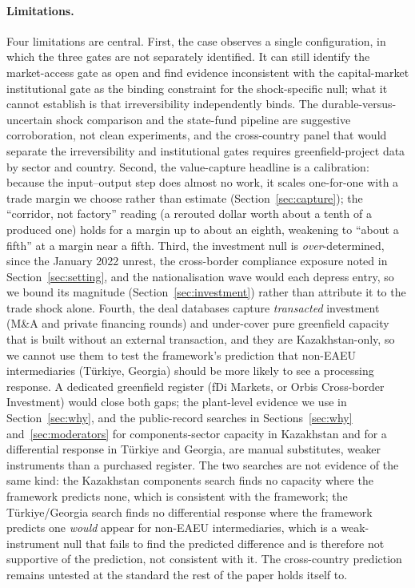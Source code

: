 \documentclass[12pt]{article}
\begin{document}
\paragraph{Limitations.} Four limitations are central. First, the case observes a single
configuration, in which the three gates are not separately identified. It can still identify
the market-access gate as open and find evidence inconsistent with the capital-market
institutional gate as the
binding constraint for the shock-specific null; what it cannot establish is that
irreversibility independently binds. The durable-versus-uncertain shock comparison and the
state-fund pipeline are suggestive corroboration, not clean experiments, and the cross-country
panel that would separate the irreversibility and institutional gates requires
greenfield-project data by sector and country. Second, the value-capture headline is a
calibration: because the input--output step does almost no work, it scales one-for-one with a
trade margin we choose rather than estimate (Section~\ref{sec:capture}); the
``corridor, not factory'' reading (a rerouted dollar worth about a tenth of a produced one)
holds for a margin up to about an eighth, weakening to ``about a fifth'' at a margin near a
fifth. Third, the investment null is
\emph{over}-determined, since the January 2022 unrest, the cross-border compliance exposure
noted in Section~\ref{sec:setting}, and the nationalisation wave would each depress entry, so
we bound its magnitude (Section~\ref{sec:investment}) rather than attribute it to the trade
shock alone. Fourth, the deal databases capture \emph{transacted} investment (M\&A and private
financing rounds) and under-cover pure greenfield capacity that is built without an external
transaction, and they are Kazakhstan-only, so we cannot use them to test the framework's
prediction that non-EAEU intermediaries (T\"urkiye, Georgia) should be more likely to see a
processing response. A dedicated greenfield register (fDi Markets, or Orbis Cross-border
Investment) would close both gaps; the plant-level evidence we use in Section~\ref{sec:why},
and the public-record searches in Sections~\ref{sec:why} and~\ref{sec:moderators} for
components-sector capacity in Kazakhstan and for a differential response in T\"urkiye and
Georgia, are manual substitutes, weaker instruments than a purchased register. The two
searches are not evidence of the same kind: the Kazakhstan components search finds no
capacity where the framework predicts none, which is consistent with the framework; the
T\"urkiye/Georgia search finds no differential response where the framework predicts one
\emph{would} appear for non-EAEU intermediaries, which is a weak-instrument null that fails to
find the predicted difference and is therefore not supportive of the prediction, not
consistent with it. The cross-country prediction remains untested at the standard the rest of
the paper holds itself to.
\end{document}
